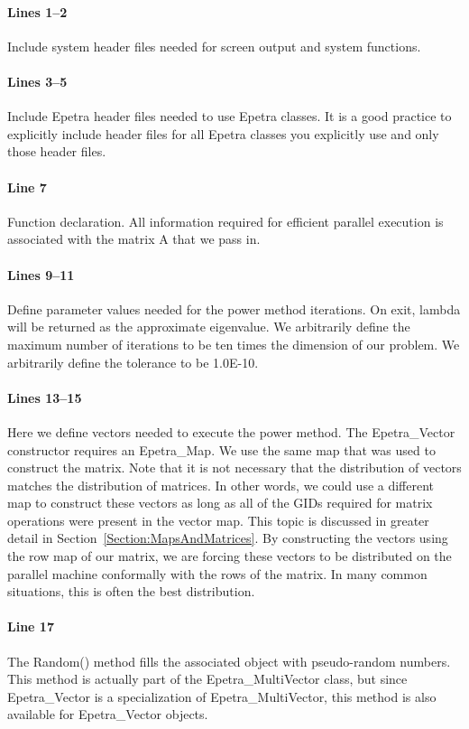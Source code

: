 \documentclass[12pt,relax]{EpetraUserGuide}
\newcommand{\map}{Epetra\_Map}
\renewcommand{\vector}{Epetra\_Vector}
\newcommand{\multivector}{Epetra\_MultiVector}
\begin{document}
\paragraph{Lines 1--2}
Include system header files needed for screen output and system
functions.
\paragraph{Lines 3--5}
Include Epetra header files needed to use Epetra classes.
It is a good practice to explicitly include header files for all
Epetra classes you explicitly use and only those header files.
\paragraph{Line 7} Function declaration.  All information required for
efficient parallel execution is associated with the matrix A that we
pass in.
\paragraph{Lines 9--11}
Define parameter values needed for the power method iterations.  On
exit, lambda will be returned as the approximate eigenvalue.  We
arbitrarily define the maximum number of iterations to be ten times
the dimension of our problem.  We arbitrarily define the tolerance to
be 1.0E-10.
\paragraph{Lines 13--15}
Here we define vectors needed to execute the power method.  The
\vector{} constructor requires an \map{}.  We use the same map that
was used to construct the matrix.  Note that it is not necessary that
the distribution of vectors matches the distribution of matrices.  In
other words, we could use a different map to construct these vectors
as long as all of the GIDs required for matrix operations were present
in the vector map.  This topic is discussed in greater detail in
Section~\ref{Section:MapsAndMatrices}.  By constructing the vectors using
the row map of our matrix, we are forcing these vectors to be
distributed on the parallel machine conformally with the rows of the
matrix.  In many common situations, this is often the best 
distribution.
\paragraph{Line 17}
The Random() method fills the associated object with pseudo-random
numbers.  This method is actually part of the \multivector{} class,
but since \vector{} is a specialization of \multivector{}, this method
is also available for \vector{} objects.
\end{document}
